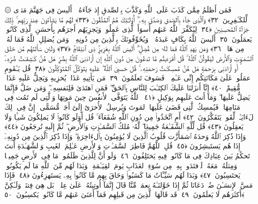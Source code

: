  ۞ فَمَن أَظلَمُ مِمَّن كَذَبَ عَلَى ٱللَّهِ وَكَذَّبَ بِٱلصِّدقِ إِذ جَآءَهُۥٓ ۚ أَلَيسَ فِى جَهَنَّمَ مَثوًۭى لِّلكَـٰفِرِينَ ﴿٣٢﴾
 وَٱلَّذِى جَآءَ بِٱلصِّدقِ وَصَدَّقَ بِهِۦٓ ۙ أُو۟لَـٰٓئِكَ هُمُ ٱلمُتَّقُونَ ﴿٣٣﴾
 لَهُم مَّا يَشَآءُونَ عِندَ رَبِّهِم ۚ ذَٟلِكَ جَزَآءُ ٱلمُحسِنِينَ ﴿٣٤﴾
 لِيُكَفِّرَ ٱللَّهُ عَنهُم أَسوَأَ ٱلَّذِى عَمِلُوا۟ وَيَجزِيَهُم أَجرَهُم بِأَحسَنِ ٱلَّذِى كَانُوا۟ يَعمَلُونَ ﴿٣٥﴾
 أَلَيسَ ٱللَّهُ بِكَافٍ عَبدَهُۥ ۖ وَيُخَوِّفُونَكَ بِٱلَّذِينَ مِن دُونِهِۦ ۚ وَمَن يُضلِلِ ٱللَّهُ فَمَا لَهُۥ مِن هَادٍۢ ﴿٣٦﴾
 وَمَن يَهدِ ٱللَّهُ فَمَا لَهُۥ مِن مُّضِلٍّ ۗ أَلَيسَ ٱللَّهُ بِعَزِيزٍۢ ذِى ٱنتِقَامٍۢ ﴿٣٧﴾
 وَلَئِن سَأَلتَهُم مَّن خَلَقَ ٱلسَّمَـٰوَٟتِ وَٱلأَرضَ لَيَقُولُنَّ ٱللَّهُ ۚ قُل أَفَرَءَيتُم مَّا تَدعُونَ مِن دُونِ ٱللَّهِ إِن أَرَادَنِىَ ٱللَّهُ بِضُرٍّ هَل هُنَّ كَـٰشِفَـٰتُ ضُرِّهِۦٓ أَو أَرَادَنِى بِرَحمَةٍ هَل هُنَّ مُمسِكَـٰتُ رَحمَتِهِۦ ۚ قُل حَسبِىَ ٱللَّهُ ۖ عَلَيهِ يَتَوَكَّلُ ٱلمُتَوَكِّلُونَ ﴿٣٨﴾
 قُل يَـٰقَومِ ٱعمَلُوا۟ عَلَىٰ مَكَانَتِكُم إِنِّى عَـٰمِلٌۭ ۖ فَسَوفَ تَعلَمُونَ ﴿٣٩﴾
 مَن يَأتِيهِ عَذَابٌۭ يُخزِيهِ وَيَحِلُّ عَلَيهِ عَذَابٌۭ مُّقِيمٌ ﴿٤٠﴾
 إِنَّآ أَنزَلنَا عَلَيكَ ٱلكِتَـٰبَ لِلنَّاسِ بِٱلحَقِّ ۖ فَمَنِ ٱهتَدَىٰ فَلِنَفسِهِۦ ۖ وَمَن ضَلَّ فَإِنَّمَا يَضِلُّ عَلَيهَا ۖ وَمَآ أَنتَ عَلَيهِم بِوَكِيلٍ ﴿٤١﴾
 ٱللَّهُ يَتَوَفَّى ٱلأَنفُسَ حِينَ مَوتِهَا وَٱلَّتِى لَم تَمُت فِى مَنَامِهَا ۖ فَيُمسِكُ ٱلَّتِى قَضَىٰ عَلَيهَا ٱلمَوتَ وَيُرسِلُ ٱلأُخرَىٰٓ إِلَىٰٓ أَجَلٍۢ مُّسَمًّى ۚ إِنَّ فِى ذَٟلِكَ لَءَايَـٰتٍۢ لِّقَومٍۢ يَتَفَكَّرُونَ ﴿٤٢﴾
 أَمِ ٱتَّخَذُوا۟ مِن دُونِ ٱللَّهِ شُفَعَآءَ ۚ قُل أَوَلَو كَانُوا۟ لَا يَملِكُونَ شَيـًۭٔا وَلَا يَعقِلُونَ ﴿٤٣﴾
 قُل لِّلَّهِ ٱلشَّفَـٰعَةُ جَمِيعًۭا ۖ لَّهُۥ مُلكُ ٱلسَّمَـٰوَٟتِ وَٱلأَرضِ ۖ ثُمَّ إِلَيهِ تُرجَعُونَ ﴿٤٤﴾
 وَإِذَا ذُكِرَ ٱللَّهُ وَحدَهُ ٱشمَأَزَّت قُلُوبُ ٱلَّذِينَ لَا يُؤمِنُونَ بِٱلءَاخِرَةِ ۖ وَإِذَا ذُكِرَ ٱلَّذِينَ مِن دُونِهِۦٓ إِذَا هُم يَستَبشِرُونَ ﴿٤٥﴾
 قُلِ ٱللَّهُمَّ فَاطِرَ ٱلسَّمَـٰوَٟتِ وَٱلأَرضِ عَـٰلِمَ ٱلغَيبِ وَٱلشَّهَـٰدَةِ أَنتَ تَحكُمُ بَينَ عِبَادِكَ فِى مَا كَانُوا۟ فِيهِ يَختَلِفُونَ ﴿٤٦﴾
 وَلَو أَنَّ لِلَّذِينَ ظَلَمُوا۟ مَا فِى ٱلأَرضِ جَمِيعًۭا وَمِثلَهُۥ مَعَهُۥ لَٱفتَدَوا۟ بِهِۦ مِن سُوٓءِ ٱلعَذَابِ يَومَ ٱلقِيَـٰمَةِ ۚ وَبَدَا لَهُم مِّنَ ٱللَّهِ مَا لَم يَكُونُوا۟ يَحتَسِبُونَ ﴿٤٧﴾
 وَبَدَا لَهُم سَيِّـَٔاتُ مَا كَسَبُوا۟ وَحَاقَ بِهِم مَّا كَانُوا۟ بِهِۦ يَستَهزِءُونَ ﴿٤٨﴾
 فَإِذَا مَسَّ ٱلإِنسَـٰنَ ضُرٌّۭ دَعَانَا ثُمَّ إِذَا خَوَّلنَـٰهُ نِعمَةًۭ مِّنَّا قَالَ إِنَّمَآ أُوتِيتُهُۥ عَلَىٰ عِلمٍۭ ۚ بَل هِىَ فِتنَةٌۭ وَلَـٰكِنَّ أَكثَرَهُم لَا يَعلَمُونَ ﴿٤٩﴾
 قَد قَالَهَا ٱلَّذِينَ مِن قَبلِهِم فَمَآ أَغنَىٰ عَنهُم مَّا كَانُوا۟ يَكسِبُونَ ﴿٥٠﴾
